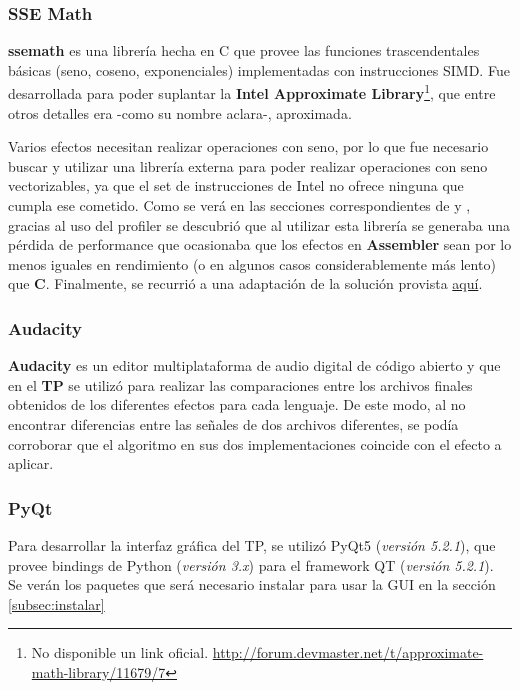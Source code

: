 \subsubsection{SSE Math}
\label{subsec:ssemath}
\textbf{ssemath} es una librería hecha en C que provee las funciones trascendentales básicas (seno, coseno, exponenciales) implementadas con instrucciones SIMD. Fue desarrollada para poder suplantar la \textbf{Intel Approximate Library}\footnote{No disponible un link oficial. \url{http://forum.devmaster.net/t/approximate-math-library/11679/7}}, que entre otros detalles era -como su nombre aclara-, aproximada.\vspace{\baselineskip}

Varios efectos necesitan realizar operaciones con seno, por lo que fue necesario buscar y utilizar una librería externa para poder realizar operaciones con seno vectorizables, ya que el set de instrucciones de Intel no ofrece ninguna que cumpla ese cometido. Como se verá en las secciones correspondientes de  y , gracias al uso del profiler se descubrió que al utilizar esta librería se generaba una pérdida de performance que ocasionaba que los efectos en \textbf{Assembler} sean por lo menos iguales en rendimiento (o en algunos casos considerablemente más lento) que \textbf{C}. Finalmente, se recurrió a una adaptación de la solución provista \href{http://forum.devmaster.net/t/fast-and-accurate-sine-cosine/9648}{aquí}.

\subsubsection{Audacity}
\label{subsec:audacity}
\textbf{Audacity} es un editor multiplataforma de audio digital de código abierto y que en el \textbf{TP} se utilizó para realizar las comparaciones entre los archivos finales obtenidos de los diferentes efectos para cada lenguaje. De este modo, al no encontrar diferencias entre las señales de dos archivos diferentes, se podía corroborar que el algoritmo en sus dos implementaciones coincide con el efecto a aplicar.

\subsubsection{PyQt}
Para desarrollar la interfaz gráfica del TP, se utilizó PyQt5 (\textit{versión 5.2.1}), que provee bindings de Python (\textit{versión 3.x}) para el framework QT (\textit{versión 5.2.1}). Se verán los paquetes que será necesario instalar para usar la GUI en la sección \ref{subsec:instalar}

